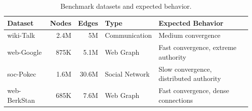 \begin{table}[ht]
\centering
\setlength{\tabcolsep}{6pt}
\renewcommand{\arraystretch}{1.2}
\begin{tabularx}{\linewidth}{l r r l X}
\toprule
\textbf{Dataset} & \textbf{Nodes} & \textbf{Edges} & \textbf{Type} & \textbf{Expected Behavior} \\
\midrule
wiki-Talk    & 2.4M & 5M    & Communication & Medium convergence \\
web-Google   & 875K & 5.1M  & Web Graph & Fast convergence, extreme authority \\
soc-Pokec    & 1.6M & 30.6M & Social Network & Slow convergence, distributed authority \\
web-BerkStan & 685K & 7.6M  & Web Graph & Fast convergence, dense connections \\
\bottomrule
\end{tabularx}
\caption{Benchmark datasets and expected behavior.}
\label{tab:datasets}
\end{table}











